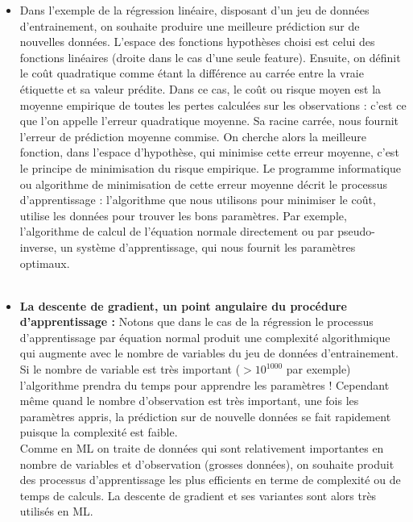 \documentclass[executivepaper]{article}
\begin{document}
\begin{itemize}
\item Dans l'exemple de la régression linéaire, disposant d'un jeu de données d'entrainement, on souhaite produire une meilleure prédiction sur de nouvelles données. L'espace des fonctions hypothèses choisi est celui des fonctions linéaires (droite dans le cas d'une seule feature). Ensuite, on définit le coût quadratique comme étant la différence \og au carrée \fg{} entre la vraie étiquette et sa valeur prédite. Dans ce cas, le coût ou risque moyen est la moyenne empirique de toutes les pertes calculées sur les observations : c'est ce que l'on appelle l'erreur quadratique moyenne. Sa racine carrée, nous fournit l'erreur de prédiction moyenne commise. On cherche alors la meilleure fonction, dans l'espace d'hypothèse, qui minimise cette erreur moyenne, c'est le principe de minimisation du risque empirique. Le programme informatique ou algorithme de minimisation de cette erreur moyenne décrit le processus d'apprentissage : l'algorithme que nous utilisons pour minimiser le coût, utilise les données pour trouver les bons paramètres. Par exemple, l'algorithme de calcul de l'équation normale directement ou par pseudo-inverse, un système d'apprentissage, qui nous fournit les paramètres optimaux. \\~\

\item \textbf{La descente de gradient, un point angulaire du procédure d'apprentissage :} Notons que dans le cas de la régression le processus d'apprentissage par équation normal produit une complexité algorithmique qui augmente avec le nombre de variables du jeu de données d'entrainement. Si le nombre de variable est très important ($>10^{1000}$ par exemple) l'algorithme prendra du temps pour apprendre les paramètres ! Cependant même quand le nombre d'observation est très important, une fois les paramètres appris, la prédiction sur de nouvelle données se fait rapidement puisque la complexité est faible.\\

Comme en ML on traite de données qui sont relativement importantes en nombre de variables et d'observation (grosses données), on souhaite produit des processus d'apprentissage les plus efficients en terme de complexité ou de temps de calculs. La descente de gradient et ses variantes sont alors très utilisés en ML.\\


\end{itemize}
\end{document}
